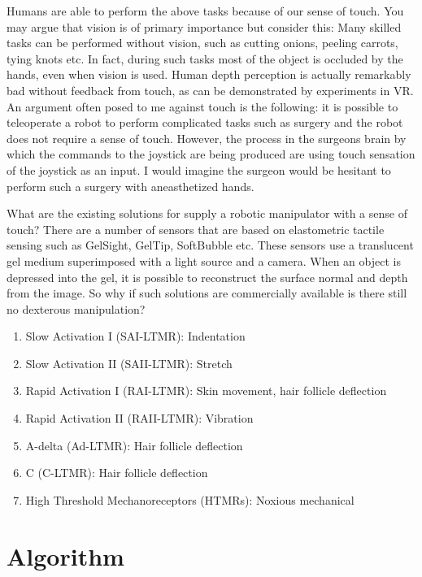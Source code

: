 \documentclass[12pt, letterpaper, twoside]{article}
\theoremstyle{definition}
\begin{document}
Humans are able to perform the above tasks because of our sense of touch.
You may argue that vision is of primary importance but consider this:
Many skilled tasks can be performed without vision, such as cutting onions,
peeling carrots, tying knots etc. In fact, during such tasks most of the object
is occluded by the hands, even when vision is used. Human depth
perception is actually remarkably bad without feedback from touch, as can
be demonstrated by experiments in VR. An argument often posed to me
against touch is the following: it is possible to teleoperate a robot to
perform complicated tasks such as surgery and the robot does not require
a sense of touch. However, the process in the surgeons brain
by which the commands to the joystick are being produced are using
touch sensation of the joystick as an input. I would imagine the surgeon
would be hesitant to perform such a surgery with aneasthetized hands.

What are the existing solutions for supply a robotic manipulator with a
sense of touch? There are a number of sensors that are based on elastometric
tactile sensing such as GelSight, GelTip, SoftBubble etc. These sensors
use a translucent gel medium superimposed with a light source and a camera.
When an object is depressed into the gel, it is possible to reconstruct the
surface normal and depth from the image. So why if such solutions are
commercially available is there still no dexterous manipulation?

\begin{enumerate}
\item Slow Activation I (SAI-LTMR): Indentation
\item Slow Activation II (SAII-LTMR): Stretch
\item Rapid Activation I (RAI-LTMR): Skin movement, hair follicle deflection
\item Rapid Activation II (RAII-LTMR): Vibration
\item A-delta (Ad-LTMR): Hair follicle deflection
\item C (C-LTMR): Hair follicle deflection
\item High Threshold Mechanoreceptors (HTMRs): Noxious mechanical
\end{enumerate}

\section{Algorithm}
\end{document}
